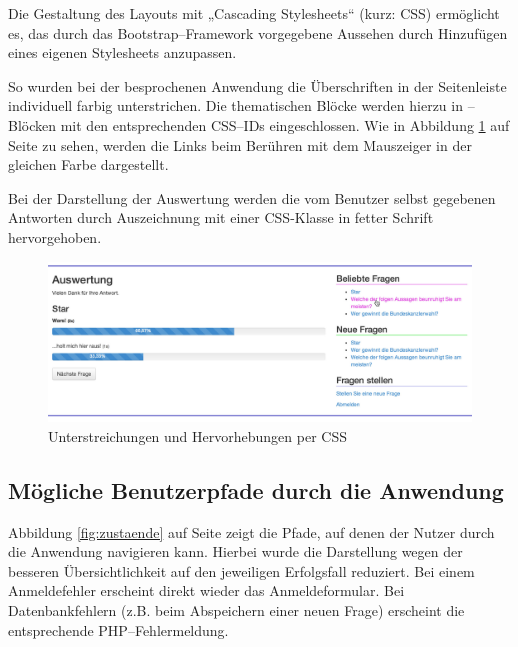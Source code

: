 Die Gestaltung des Layouts mit „Cascading Stylesheets“ (kurz: CSS) ermöglicht es, das durch das Bootstrap--Framework vorgegebene Aussehen durch Hinzufügen eines eigenen Stylesheets anzupassen.

So wurden bei der besprochenen Anwendung die Überschriften in der Seitenleiste individuell farbig unterstrichen. Die thematischen Blöcke werden hierzu in --Blöcken mit den entsprechenden CSS--IDs eingeschlossen. Wie in Abbildung \ref{fig:seitenleiste} auf Seite \pageref{fig:seitenleiste} zu sehen, werden die Links beim Berühren mit dem Mauszeiger in der gleichen Farbe dargestellt.

Bei der Darstellung der Auswertung werden die vom Benutzer selbst gegebenen Antworten durch Auszeichnung mit einer CSS-Klasse in fetter Schrift hervorgehoben. 

\begin{figure}[h]
\begin{center}
\includegraphics[width=\textwidth]{seitenleiste.jpg}
\caption{Unterstreichungen und Hervorhebungen per CSS}
\label{fig:seitenleiste}
\end{center}
\end{figure}

\subsection{Mögliche Benutzerpfade durch die Anwendung}

Abbildung \ref{fig:zustaende} auf Seite \pageref{fig:zustaende} zeigt die Pfade, auf denen der Nutzer durch die Anwendung navigieren kann. Hierbei wurde die Darstellung wegen der besseren Übersichtlichkeit auf den jeweiligen Erfolgsfall reduziert. Bei einem Anmeldefehler erscheint direkt wieder das Anmeldeformular. Bei Datenbankfehlern (z.B. beim Abspeichern einer neuen Frage) erscheint die entsprechende PHP--Fehlermeldung.

